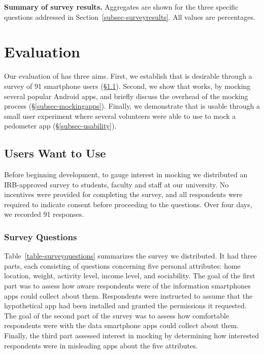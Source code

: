 
\begin{table}[t]
  
  
  
  \caption{\textbf{Summary of survey results.} Aggregates are shown for the
    three specific questions addressed in Section~\ref{subsec-surveyresults}.
    All values are percentages.}
  
  \label{table-surveysummary}

\end{table}

\section{Evaluation}
\label{sec-evaluation}

Our evaluation of \PocketMocker{} has three aims. First, we establish that
\PocketMocker{} is desirable through a survey of 91 smartphone users
(\S\ref{subsec-survey}). Second, we show that \PocketMocker{} works, by
mocking several popular Android apps, and briefly discuss the overhead of the
mocking process (\S\ref{subsec-mockingapps}). Finally, we demonstrate that
\PocketMocker{} is usable through a small user experiment where several
volunteers were able to use \PocketMocker{} to mock a pedometer app
(\S\ref{subsec-usability}).

\subsection{Users Want to Use \PocketMocker{}}
\label{subsec-survey}

Before beginning \PocketMocker{} development, to gauge interest in mocking we
distributed an IRB-approved survey to students, faculty and staff at our
university. No incentives were provided for completing the survey, and all
respondents were required to indicate consent before proceeding to the
questions. Over four days, we recorded 91 responses.

\subsubsection{Survey Questions}

Table~\ref{table-surveyquestions} summarizes the survey we distributed. It
had three parts, each consisting of questions concerning five personal
attributes: home location, weight, activity level, income level, and
sociability. The goal of the first part was to assess how aware respondents
were of the information smartphones apps could collect about them.
Respondents were instructed to assume that the hypothetical app had been
installed and granted the permissions it requested. The goal of the second
part of the survey was to assess how comfortable respondents were with the
data smartphone apps could collect about them. Finally, the third part
assessed interest in mocking by determining how interested respondents were
in misleading apps about the five attributes.

